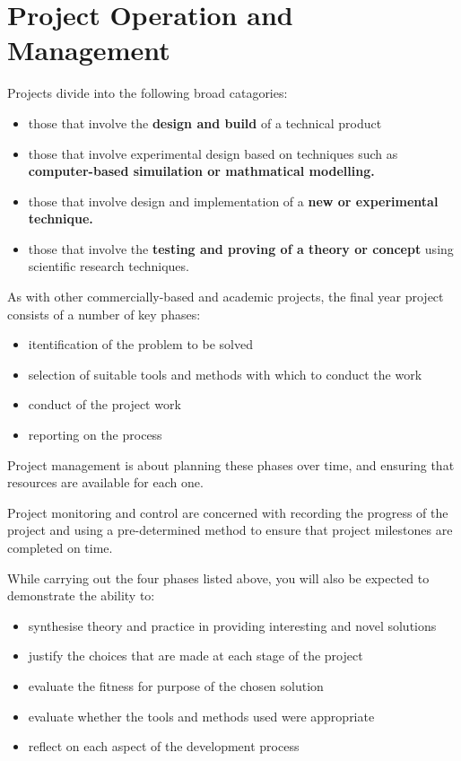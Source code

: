 \chapter{Project Operation and Management}

Projects divide into the following broad catagories:

\begin{itemize}
    \item those that involve the \textbf{design and build} of a technical product
    \item those that involve experimental design based on techniques such as \textbf{computer-based simuilation or mathmatical modelling.}
    \item those that involve design and implementation of a \textbf{new or experimental technique.}
    \item those that involve the \textbf{testing and proving of a theory or concept} using scientific research techniques. 
\end{itemize}

As with other commercially-based and academic projects, the final year project consists of a number of key phases: 

\begin{itemize}
    \item itentification of the problem to be solved
    \item selection of suitable tools and methods with which to conduct the work
    \item conduct of the project work
    \item reporting on the process
\end{itemize}

Project management is about planning these phases over time, and ensuring that resources are available for each one.

Project monitoring and control are concerned with recording the progress of the project and using a pre-determined method to ensure that project milestones are completed on time.

While carrying out the four phases listed above, you will also be expected to demonstrate the ability to:

\begin{itemize}
    \item synthesise theory and practice in providing interesting and novel solutions
    \item justify the choices that are made at each stage of the project
    \item evaluate the fitness for purpose of the chosen solution
    \item evaluate whether the tools and methods used were appropriate
    \item reflect on each aspect of the development process
\end{itemize}

